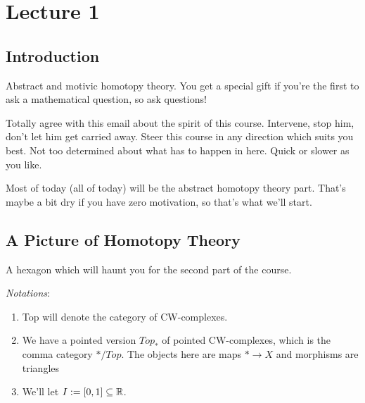 \documentclass[class=report, crop=false,a4paper,twoside]{standalone}
\begin{document}
\chapter{Lecture 1}
\section{Introduction}
Abstract and motivic homotopy theory. You get a special gift if you're the first to ask a mathematical question, so ask questions!

Totally agree with this email about the spirit of this course. Intervene, stop him, don't let him get carried away. Steer this course in any direction which suits you best. Not too determined about what has to happen in here. Quick or slower as you like.

Most of today (all of today) will be the abstract homotopy theory part. That's maybe a bit dry if you have zero motivation, so that's what we'll start.

\section{A Picture of Homotopy Theory}
A hexagon which will haunt you for the second part of the course. 

\emph{Notations}: 
\begin{enumerate}
	\item Top will denote the category of CW-complexes.
	\item We have a pointed version $Top_*$ of pointed CW-complexes, which is the comma category $*/Top$. The objects  here are maps $* \to X$ and morphisms are triangles
	\begin{center}
	\end{center}
	\item We'll let $I := [0,1] \subseteq \mathbb{R}$.
\end{enumerate}
\end{document}
